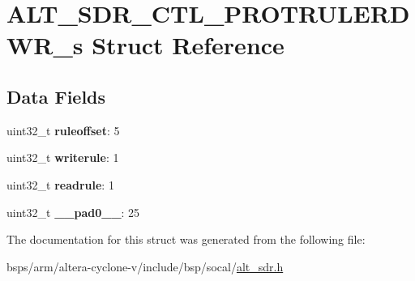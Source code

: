\hypertarget{structALT__SDR__CTL__PROTRULERDWR__s}{}\section{A\+L\+T\+\_\+\+S\+D\+R\+\_\+\+C\+T\+L\+\_\+\+P\+R\+O\+T\+R\+U\+L\+E\+R\+D\+W\+R\+\_\+s Struct Reference}
\label{structALT__SDR__CTL__PROTRULERDWR__s}
\subsection*{Data Fields}
\begin{DoxyCompactItemize}
\item 
\mbox{\label{structALT__SDR__CTL__PROTRULERDWR__s_ac5e6f3ae226fd7c897667d155204a16e}} 
uint32\+\_\+t {\bfseries ruleoffset}\+: 5
\item 
\mbox{\label{structALT__SDR__CTL__PROTRULERDWR__s_a5b4514b507acc7118f9ef8b854bc4bd5}} 
uint32\+\_\+t {\bfseries writerule}\+: 1
\item 
\mbox{\label{structALT__SDR__CTL__PROTRULERDWR__s_a579573cc6766c9e25d67b686021aab05}} 
uint32\+\_\+t {\bfseries readrule}\+: 1
\item 
\mbox{\label{structALT__SDR__CTL__PROTRULERDWR__s_a79b4d5764dfe35f5f09c6979ff052aba}} 
uint32\+\_\+t {\bfseries \+\_\+\+\_\+pad0\+\_\+\+\_\+}\+: 25
\end{DoxyCompactItemize}


The documentation for this struct was generated from the following file\+:\begin{DoxyCompactItemize}
\item 
bsps/arm/altera-\/cyclone-\/v/include/bsp/socal/\mbox{\hyperlink{alt__sdr_8h}{alt\+\_\+sdr.\+h}}\end{DoxyCompactItemize}
